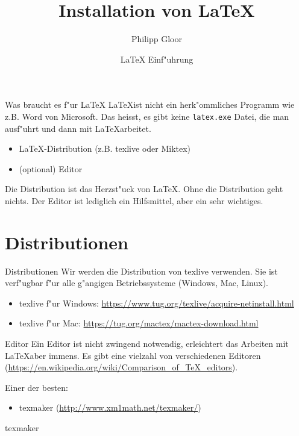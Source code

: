 \documentclass[10pt, xcolor={table}]{beamer}
\title[Installation von \LaTeX] %
{Installation von \LaTeX}
\author{Philipp Gloor}
\institute[] %
{\inst{1}philipp.gloor@gmail.com}
\date[Feburar 2016] %
{\LaTeX{} Einf"uhrung}
\newlength{\wideitemsep}
\let\olditem\item
\renewcommand{\item}{\setlength{\itemsep}{\wideitemsep}\olditem}
\begin{document}
\begin{frame}
  \titlepage
\end{frame}
\begin{frame}{Was braucht es f"ur \LaTeX}
\LaTeX ist nicht ein herk"ommliches Programm wie z.B. Word von Microsoft. Das heisst, es gibt keine
\texttt{latex.exe} Datei, die man ausf"uhrt und dann mit \LaTeX arbeitet.
\begin{itemize}
  \item \LaTeX-Distribution (z.B. texlive oder Miktex)
  \item (optional) Editor
\end{itemize}

Die Distribution ist das Herzst"uck von \LaTeX. Ohne die Distribution geht nichts. Der Editor
ist lediglich ein Hilfsmittel, aber ein sehr wichtiges.
\end{frame}


\section{Distributionen}
\begin{frame}{Distributionen}
Wir werden die Distribution von texlive verwenden. Sie ist verf"ugbar f"ur alle g"angigen 
Betriebssysteme (Windows, Mac, Linux).

\begin{itemize}
  \item texlive f"ur Windows: \url{https://www.tug.org/texlive/acquire-netinstall.html}
  \item texlive f"ur Mac: \url{https://tug.org/mactex/mactex-download.html}
\end{itemize}
\end{frame}

\begin{frame}{Editor}
  Ein Editor ist nicht zwingend notwendig, erleichtert das Arbeiten mit \LaTeX aber immens. Es gibt eine vielzahl
  von verschiedenen Editoren (\url{https://en.wikipedia.org/wiki/Comparison_of_TeX_editors}).

  Einer der besten:
  \begin{itemize}
    \item texmaker (\url{http://www.xm1math.net/texmaker/})
  \end{itemize}
\end{frame}

\begin{frame}{texmaker}
  
\end{frame}
\end{document}
